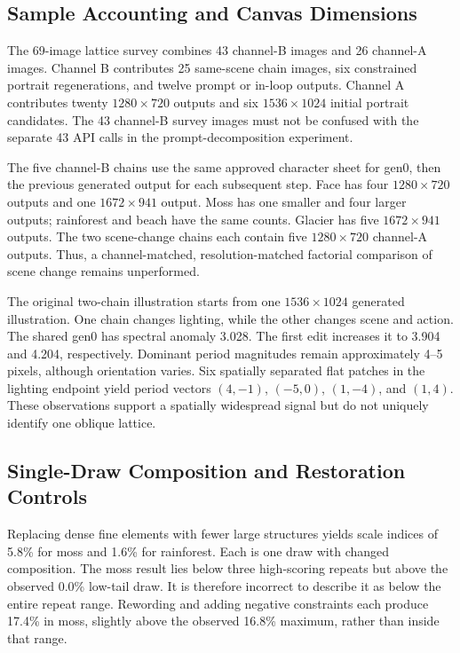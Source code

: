 \documentclass[sigplan,10pt,nonacm]{acmart}
\begin{document}
\subsection{Sample Accounting and Canvas Dimensions}
The 69-image lattice survey combines 43 channel-B images and 26 channel-A images. Channel B contributes 25 same-scene chain images, six constrained portrait regenerations, and twelve prompt or in-loop outputs. Channel A contributes twenty $1280\times720$ outputs and six $1536\times1024$ initial portrait candidates. The 43 channel-B survey images must not be confused with the separate 43 API calls in the prompt-decomposition experiment.

The five channel-B chains use the same approved character sheet for gen0, then the previous generated output for each subsequent step. Face has four $1280\times720$ outputs and one $1672\times941$ output. Moss has one smaller and four larger outputs; rainforest and beach have the same counts. Glacier has five $1672\times941$ outputs. The two scene-change chains each contain five $1280\times720$ channel-A outputs. Thus, a channel-matched, resolution-matched factorial comparison of scene change remains unperformed.

The original two-chain illustration starts from one $1536\times1024$ generated illustration. One chain changes lighting, while the other changes scene and action. The shared gen0 has spectral anomaly 3.028. The first edit increases it to 3.904 and 4.204, respectively. Dominant period magnitudes remain approximately 4--5 pixels, although orientation varies. Six spatially separated flat patches in the lighting endpoint yield period vectors $(4,-1)$, $(-5,0)$, $(1,-4)$, and $(1,4)$. These observations support a spatially widespread signal but do not uniquely identify one oblique lattice.

\subsection{Single-Draw Composition and Restoration Controls}
Replacing dense fine elements with fewer large structures yields scale indices of 5.8\% for moss and 1.6\% for rainforest. Each is one draw with changed composition. The moss result lies below three high-scoring repeats but above the observed 0.0\% low-tail draw. It is therefore incorrect to describe it as below the entire repeat range. Rewording and adding negative constraints each produce 17.4\% in moss, slightly above the observed 16.8\% maximum, rather than inside that range.
\end{document}

